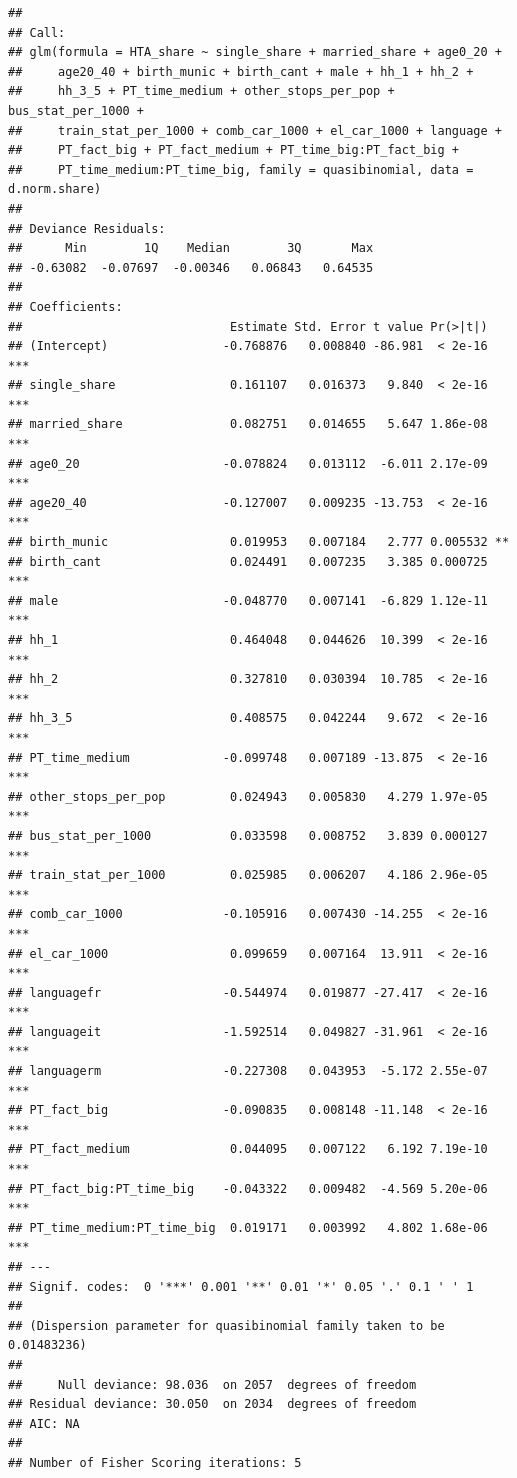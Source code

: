 \documentclass[
]{article}
\begin{document}
\begin{verbatim}
## 
## Call:
## glm(formula = HTA_share ~ single_share + married_share + age0_20 + 
##     age20_40 + birth_munic + birth_cant + male + hh_1 + hh_2 + 
##     hh_3_5 + PT_time_medium + other_stops_per_pop + bus_stat_per_1000 + 
##     train_stat_per_1000 + comb_car_1000 + el_car_1000 + language + 
##     PT_fact_big + PT_fact_medium + PT_time_big:PT_fact_big + 
##     PT_time_medium:PT_time_big, family = quasibinomial, data = d.norm.share)
## 
## Deviance Residuals: 
##      Min        1Q    Median        3Q       Max  
## -0.63082  -0.07697  -0.00346   0.06843   0.64535  
## 
## Coefficients:
##                             Estimate Std. Error t value Pr(>|t|)    
## (Intercept)                -0.768876   0.008840 -86.981  < 2e-16 ***
## single_share                0.161107   0.016373   9.840  < 2e-16 ***
## married_share               0.082751   0.014655   5.647 1.86e-08 ***
## age0_20                    -0.078824   0.013112  -6.011 2.17e-09 ***
## age20_40                   -0.127007   0.009235 -13.753  < 2e-16 ***
## birth_munic                 0.019953   0.007184   2.777 0.005532 ** 
## birth_cant                  0.024491   0.007235   3.385 0.000725 ***
## male                       -0.048770   0.007141  -6.829 1.12e-11 ***
## hh_1                        0.464048   0.044626  10.399  < 2e-16 ***
## hh_2                        0.327810   0.030394  10.785  < 2e-16 ***
## hh_3_5                      0.408575   0.042244   9.672  < 2e-16 ***
## PT_time_medium             -0.099748   0.007189 -13.875  < 2e-16 ***
## other_stops_per_pop         0.024943   0.005830   4.279 1.97e-05 ***
## bus_stat_per_1000           0.033598   0.008752   3.839 0.000127 ***
## train_stat_per_1000         0.025985   0.006207   4.186 2.96e-05 ***
## comb_car_1000              -0.105916   0.007430 -14.255  < 2e-16 ***
## el_car_1000                 0.099659   0.007164  13.911  < 2e-16 ***
## languagefr                 -0.544974   0.019877 -27.417  < 2e-16 ***
## languageit                 -1.592514   0.049827 -31.961  < 2e-16 ***
## languagerm                 -0.227308   0.043953  -5.172 2.55e-07 ***
## PT_fact_big                -0.090835   0.008148 -11.148  < 2e-16 ***
## PT_fact_medium              0.044095   0.007122   6.192 7.19e-10 ***
## PT_fact_big:PT_time_big    -0.043322   0.009482  -4.569 5.20e-06 ***
## PT_time_medium:PT_time_big  0.019171   0.003992   4.802 1.68e-06 ***
## ---
## Signif. codes:  0 '***' 0.001 '**' 0.01 '*' 0.05 '.' 0.1 ' ' 1
## 
## (Dispersion parameter for quasibinomial family taken to be 0.01483236)
## 
##     Null deviance: 98.036  on 2057  degrees of freedom
## Residual deviance: 30.050  on 2034  degrees of freedom
## AIC: NA
## 
## Number of Fisher Scoring iterations: 5
\end{verbatim}
\end{document}
